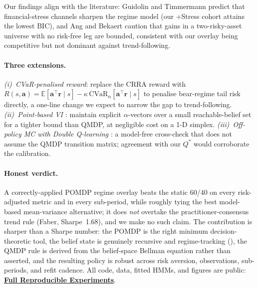 \documentclass[11pt]{article}
\theoremstyle{plain1}
\theoremstyle{definition1}
\newcommand{\E}{\mathbb{E}}
\newcommand{\1}{\mathbf{1}}
\begin{document}
Our findings align with the literature: Guidolin and Timmermann \cite{guidolin2007} predict that financial-stress channels sharpen the regime model (our +Stress cohort attains the lowest BIC), and Ang and Bekaert \cite{ang2002} caution that gains in a two-risky-asset universe with no risk-free leg are bounded, consistent with our overlay being competitive but not dominant against trend-following.

\paragraph{Three extensions.} \emph{(i)~CVaR-penalised reward}: replace the CRRA reward with $R(s,\mathbf{a})=\E[\mathbf{a}^\top\mathbf{r}\mid s]-\kappa\,\mathrm{CVaR}_\alpha[\mathbf{a}^\top\mathbf{r}\mid s]$ to penalise bear-regime tail risk directly, a one-line change we expect to narrow the gap to trend-following. \emph{(ii)~Point-based VI \cite{pineau2003}}: maintain explicit $\alpha$-vectors over a small reachable-belief set for a tighter bound than QMDP, at negligible cost on a 1-D simplex. \emph{(iii)~Off-policy MC with Double Q-learning \cite{precup2000,vanhasselt2010}}: a model-free cross-check that does not assume the QMDP transition matrix; agreement with our $Q^\ast$ would corroborate the calibration.

\paragraph{Honest verdict.} A correctly-applied POMDP regime overlay beats the static 60/40 on every risk-adjusted metric and in every sub-period, while roughly tying the best model-based mean-variance alternative; it does \emph{not} overtake the practitioner-consensus trend rule (Faber, Sharpe~1.68), and we make no such claim. The contribution is sharper than a Sharpe number: the POMDP is the right minimum decision-theoretic tool, the belief state is genuinely recursive and regime-tracking (), the QMDP rule is derived from the belief-space Bellman equation rather than asserted, and the resulting policy is robust across risk aversion, observations, sub-periods, and refit cadence. All code, data, fitted HMMs, and figures are public: \href{https://github.com/takakhoo/ENGS177_Final_Project}{\textbf{Full Reproducible Experiments}}.
\end{document}
